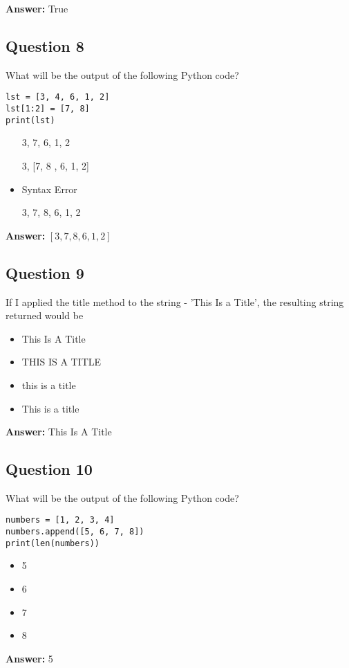 \documentclass{article}
\begin{document}
\textbf{Answer:} True

\subsection*{Question 8}
What will be the output of the following Python code?
\begin{verbatim}
lst = [3, 4, 6, 1, 2]
lst[1:2] = [7, 8]
print(lst)
\end{verbatim}

\begin{itemize}
    \item [3, 7, 6, 1, 2]
    \item [3, [7, 8], 6, 1, 2]
    \item Syntax Error
    \item [3, 7, 8, 6, 1, 2]
\end{itemize}

\textbf{Answer:} \([3, 7, 8, 6, 1, 2]\)

\subsection*{Question 9}
If I applied the title method to the string - 'This Is a Title', the resulting string returned would be
\begin{itemize}
    \item This Is A Title
    \item THIS IS A TITLE
    \item this is a title
    \item This is a title
\end{itemize}

\textbf{Answer:} This Is A Title

\subsection*{Question 10}
What will be the output of the following Python code?
\begin{verbatim}
numbers = [1, 2, 3, 4]
numbers.append([5, 6, 7, 8])
print(len(numbers))
\end{verbatim}

\begin{itemize}
    \item 5
    \item 6
    \item 7
    \item 8
\end{itemize}

\textbf{Answer:} 5
\end{document}
